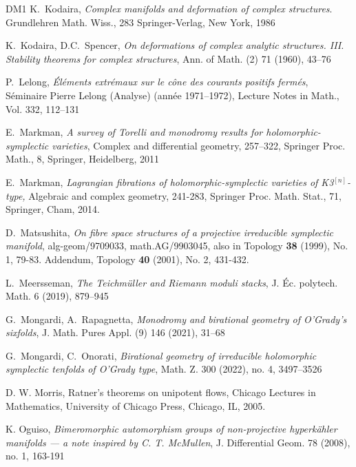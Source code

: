 \documentclass[11pt]{article}
\newcommand{\6}{\partial}
\begin{document}
{\begin{thebibliography}{DM1}
K.\ Kodaira, {\it Complex manifolds and deformation of complex structures}.
Grundlehren Math. Wiss., 283 Springer-Verlag, New York, 1986

K.\ Kodaira, D.C.\ Spencer, {\it On deformations of complex analytic structures. III. Stability theorems for complex structures},
Ann. of Math. (2) 71 (1960), 43--76

P.\ Lelong, {\it \'{E}l\'{e}ments extr\'{e}maux sur le c\^{o}ne des courants positifs ferm\'{e}s},
S\'{e}minaire {P}ierre {L}elong ({A}nalyse) (ann\'{e}e 1971--1972), Lecture Notes in Math., Vol. 332, 112--131

E.\ Markman, {\it A survey of Torelli and monodromy results for holomorphic-symplectic varieties},
Complex and differential geometry, 257--322, Springer Proc. Math., 8, Springer, Heidelberg, 2011 

E.\ Markman, 
{\em Lagrangian fibrations of holomorphic-symplectic varieties of 
{\rm K3}${}^{[n]}$-type,}
 Algebraic and complex geometry, 241-283, 
Springer Proc. Math. Stat., 71, Springer, Cham, 
2014.

D.\ Matsushita, {\em On fibre space structures of a
  projective irreducible symplectic manifold},
alg-geom/9709033, math.AG/9903045, also in Topology
{\bf 38} (1999), No. 1, 79-83. Addendum, 
Topology {\bf 40} (2001), No. 2, 431-432.

L.\ Meersseman, {\it The Teichm\"uller and Riemann moduli stacks},
J. \'Ec. polytech. Math. 6 (2019), 879--945


 G.\ Mongardi, A.\ Rapagnetta, 
{\em Monodromy and birational geometry of O'Grady's sixfolds},
J. Math. Pures Appl. (9) 146 (2021), 31--68

 G.\ Mongardi, C.\ Onorati, 
{\em Birational geometry of irreducible holomorphic symplectic 
tenfolds of O'Grady type},
Math. Z. 300 (2022), no. 4, 3497--3526

D. W. Morris, Ratner's theorems on unipotent flows, Chicago Lectures in Mathematics, University of Chicago Press, Chicago, IL, 2005.

K. Oguiso, 
{\em Bimeromorphic automorphism groups of non-projective
  hyperk\"ahler manifolds --- a note inspired by
  C. T. McMullen}, J. Differential Geom. 78 (2008), no. 1, 163-191


\end{thebibliography}}
\end{document}
